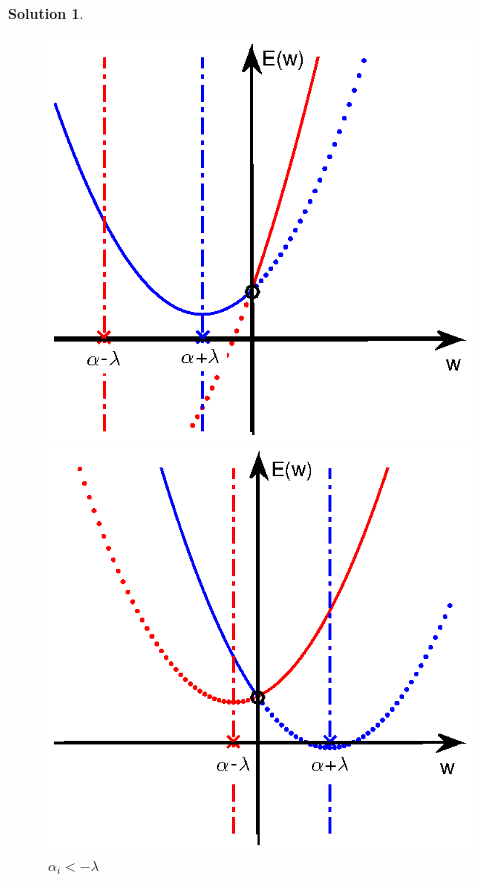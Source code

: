 \documentclass[a4paper,UTF8]{article}
\numberwithin{equation}{section}
\theoremstyle{definition}
\newtheorem*{solution}{Solution}
\begin{document}
\begin{solution}
\begin{figure}[h!]
\begin{minipage}[t]{0.3\linewidth}
     \caption{$\alpha_i>\lambda$}
     \label{fig1}
\end{minipage}
\hfill
\begin{minipage}[t]{0.3\linewidth}
     \centering
     \includegraphics[width=1\textwidth]{figure/4-3(2)new.eps} 
     \caption{$\alpha_i<-\lambda$}\label{fig2}
\end{minipage}
\hfill
\begin{minipage}[t]{0.3\linewidth}
     \centering
     \includegraphics[width=1\textwidth]{figure/4-3(3)new.eps} 

\end{minipage}
\end{figure}
\end{solution}
\end{document}
